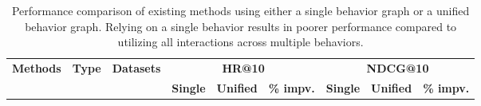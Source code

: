 \def\arraystretch{1.2} 
\setlength{\tabcolsep}{6pt}
\begin{table}[h]
\small
\caption{
Performance comparison of existing methods using either a single behavior graph or a unified behavior graph.
Relying on a single behavior results in poorer performance compared to utilizing all interactions across multiple behaviors.
\label{tab:appendix:SingleBehaviorCompareTable}
}
\centering
\begin{tabular}{cc|c|ccr|ccr}
\hline
\toprule
\multicolumn{1}{c}{\multirow{2}{*}{\textbf{Methods}}} & \multicolumn{1}{c|}{\multirow{2}{*}{\textbf{Type}}} & \multicolumn{1}{c|}{\multirow{2}{*}{\textbf{Datasets}}} & \multicolumn{3}{c|}{\textbf{HR@10}}                   & \multicolumn{3}{c}{\textbf{NDCG@10}}                  \\ 

\multicolumn{1}{l}{} & \multicolumn{1}{l|}{} & \multicolumn{1}{l|}{}  & \textbf{Single} & \textbf{Unified} & \textbf{\% impv.} & \textbf{Single} & \textbf{Unified} & \textbf{\% impv.} \\ \midrule


\end{tabular}
\end{table}
